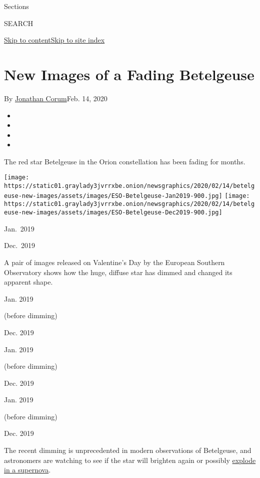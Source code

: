 Sections

SEARCH

\protect\hyperlink{site-content}{Skip to
content}\protect\hyperlink{site-index}{Skip to site index}

\hypertarget{new-images-of-a-fading-betelgeuse}{%
\section{New Images of a Fading
Betelgeuse}\label{new-images-of-a-fading-betelgeuse}}

By \href{https://www.nytimes3xbfgragh.onion/by/jonathan-corum}{Jonathan
Corum}Feb. 14, 2020

\begin{itemize}
\item
\item
\item
\item
\end{itemize}

The red star Betelgeuse in the Orion constellation has been fading for
months.

\texttt{[image: https://static01.graylady3jvrrxbe.onion/newsgraphics/2020/02/14/betelgeuse-new-images/assets/images/ESO-Betelgeuse-Jan2019-900.jpg]}
\texttt{[image: https://static01.graylady3jvrrxbe.onion/newsgraphics/2020/02/14/betelgeuse-new-images/assets/images/ESO-Betelgeuse-Dec2019-900.jpg]}

Jan.~2019

Dec.~2019

A pair of images released on Valentine's Day by the European Southern
Observatory shows how the huge, diffuse star has dimmed and changed its
apparent shape.

Jan. 2019

(before dimming)

Dec. 2019

Jan. 2019

(before dimming)

Dec. 2019

Jan. 2019

(before dimming)

Dec. 2019

The recent dimming is unprecedented in modern observations of
Betelgeuse, and astronomers are watching to see if the star will
brighten again or possibly
\href{https://www.nytimes3xbfgragh.onion/interactive/2020/01/09/science/betelgeuse-supernova-fading.html}{explode
in a supernova}.

